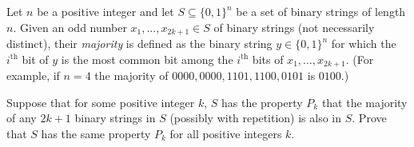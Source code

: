 Let $n$ be a positive integer and let $S \subseteq \{0, 1\}^n$ be a set of binary strings of length $n$. Given an odd number $x_1, \dots, x_{2k + 1} \in S$ of binary strings (not necessarily distinct), their \emph{majority} is defined as the binary string $y \in \{0, 1\}^n$ for which the $i^{\text{th}}$ bit of $y$ is the most common bit among the $i^{\text{th}}$ bits of $x_1, \dots,x_{2k + 1}$. (For example, if $n = 4$ the majority of $0000, 0000, 1101, 1100, 0101$ is $0100$.)

Suppose that for some positive integer $k$, $S$ has the property $P_k$ that the majority of any $2k + 1$ binary strings in $S$ (possibly with repetition) is also in $S$. Prove that $S$ has the same property $P_k$ for all positive integers $k$.